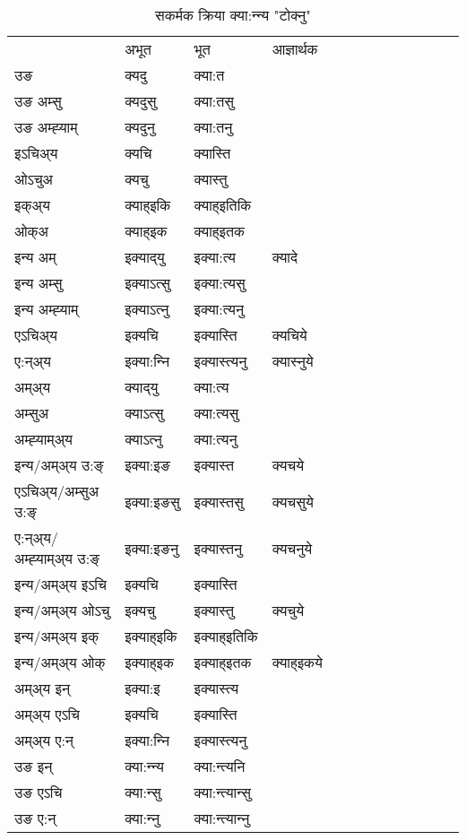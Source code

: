 \begin{table}[H]
\centering
\caption{\label{ɛt.vt} सकर्मक क्रिया  क्या:न्‍न्य  "टोक्नु"  }
\begin{tabular}{l|l|l|l|l|l|l|l|l|l|l|l|l}  \toprule
&अभूत & भूत & आज्ञार्थक \\ 
उङ &क्यदु &क्या:त \\ 
उङ अम्सु &क्यदुसु &क्या:तसु \\ 
उङ अम्ह्‍याम् &क्यदुनु &क्या:तनु \\ 
इऽचिअ्य &क्यचि &क्यास्ति   \\ 
ओऽचुअ &क्यचु &क्यास्तु   \\ 
इक्अ्य &क्याह्इकि &क्याह्इतिकि   \\ 
ओक्अ &क्याह्इक &क्याह्इतक   \\ 
इन्य अम् & इक्याद्‌यु  & इक्या:त्य &क्यादे  \\ 
इन्य अम्सु & इक्याऽत्सु  & इक्या:त्यसु   \\ 
इन्य अम्ह्‍याम् & इक्याऽत्‍नु  & इक्या:त्यनु   \\ 
एऽचिअ्य & इक्यचि & इक्यास्ति &क्यचिये    \\ 
ए:न्अ्य & इक्या:न्‍नि  & इक्यास्त्यनु &क्यास्‍नुये  \\ 
अम्अ्य & क्याद्‌यु  & क्या:त्य  \\ 
अम्सुअ & क्याऽत्सु & क्या:त्यसु  \\ 
अम्ह्‍याम्अ्य & क्याऽत्‍नु  & क्या:त्यनु \\ 
\midrule
इन्य/अम्अ्य उ:ङ्‌&इक्या:इङ & इक्यास्त &क्यचये \\ 
एऽचिअ्य/अम्सुअ उ:ङ्‌ &इक्या:इङसु & इक्यास्तसु &क्यचसुये \\ 
ए:न्अ्य/अम्ह्‍याम्अ्य उ:ङ्‌ &इक्या:इङनु & इक्यास्तनु &क्यचनुये \\ 
इन्य/अम्अ्य इऽचि & इक्यचि & इक्यास्ति    \\ 
इन्य/अम्अ्य ओऽचु & इक्यचु & इक्यास्तु  &क्यचुये  \\ 
इन्य/अम्अ्य इक् & इक्याह्इकि & इक्याह्इतिकि   \\ 
इन्य/अम्अ्य ओक् & इक्याह्इक & इक्याह्इतक  &क्याह्इकये  \\ 
अम्अ्य इन् & इक्या:इ & इक्यास्त्य   \\ 
अम्अ्य एऽचि & इक्यचि & इक्यास्ति    \\ 
अम्अ्य ए:न् & इक्या:न्‍नि  & इक्यास्त्यनु  \\ 
\midrule
उङ इन् & क्या:न्‍न्य  & क्या:न्त्यनि  \\ 
उङ एऽचि & क्या:न्सु  & क्या:न्त्यान्सु   \\ 
उङ ए:न्& क्या:न्‍नु  & क्या:न्त्यान्‍नु   \\ 
\bottomrule
\end{tabular}
\end{table}


